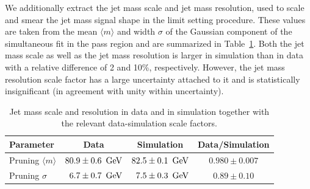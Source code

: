 \noindent We additionally extract the jet mass scale and jet mass resolution, used to scale and smear the jet mass signal shape in the limit setting procedure. These values are taken from the mean $\langle m \rangle$ and width $\sigma$ of the Gaussian
component of the simultaneous fit in the pass region and are summarized in Table~\ref{tab:searchI:params}. Both the jet mass scale as well as the jet mass resolution is larger in simulation than in data with a relative difference of 2 and 10\%, respectively.
However, the jet mass resolution scale factor has a large uncertainty attached to it and is statistically insignificant (in agreement with unity within uncertainty).
\begin{table}[!h]
 \begin{center}
 \begin{tabular}{l|c|c|c}
  Parameter & Data & Simulation & Data/Simulation \\
  \hline
  Pruning $\langle m \rangle$ &$80.9 \pm 0.6~{\rm \,\text{Ge\hspace{-.08em}V}}$   & $82.5 \pm 0.1~{\rm \,\text{Ge\hspace{-.08em}V}}$  & $0.980 \pm 0.007$ \\
  Pruning $\sigma$            & \ $6.7 \pm 0.7~{\rm \,\text{Ge\hspace{-.08em}V}}$ & \ $7.5 \pm 0.3~{\rm \,\text{Ge\hspace{-.08em}V}}$ & $0.89 \pm 0.10$ \\
  \hline
 \end{tabular}
 \caption{Jet mass scale and resolution in data and in simulation together with the relevant data-simulation scale factors.}
 \label{tab:searchI:params}
 \end{center}
\end{table}

